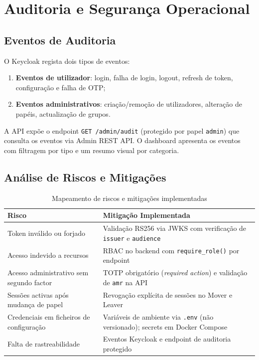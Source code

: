 \documentclass[12pt,a4paper]{article}
\begin{document}
\section{Auditoria e Segurança Operacional}

\subsection{Eventos de Auditoria}

O Keycloak regista dois tipos de eventos:

\begin{enumerate}[leftmargin=1.5cm]
  \item \textbf{Eventos de utilizador}: login, falha de login, logout, refresh de token, configuração e falha de OTP;
  \item \textbf{Eventos administrativos}: criação/remoção de utilizadores, alteração de papéis, actualização de grupos.
\end{enumerate}

A API expõe o endpoint \texttt{GET /admin/audit} (protegido por papel \texttt{admin}) que consulta os eventos via Admin REST API. O dashboard apresenta os eventos com filtragem por tipo e um resumo visual por categoria.

\subsection{Análise de Riscos e Mitigações}

\begin{table}[H]
  \centering
  \caption{Mapeamento de riscos e mitigações implementadas}
  \begin{tabularx}{\textwidth}{@{}lX@{}}
    \toprule
    \textbf{Risco} & \textbf{Mitigação Implementada} \\
    \midrule
    Token inválido ou forjado & Validação RS256 via JWKS com verificação de \texttt{issuer} e \texttt{audience} \\
    Acesso indevido a recursos & RBAC no backend com \texttt{require\_role()} por endpoint \\
    Acesso administrativo sem segundo factor & TOTP obrigatório (\textit{required action}) e validação de \texttt{amr} na API \\
    Sessões activas após mudança de papel & Revogação explícita de sessões no Mover e Leaver \\
    Credenciais em ficheiros de configuração & Variáveis de ambiente via \texttt{.env} (não versionado); secrets em Docker Compose \\
    Falta de rastreabilidade & Eventos Keycloak e endpoint de auditoria protegido \\
    \bottomrule
  \end{tabularx}
\end{table}
\end{document}
